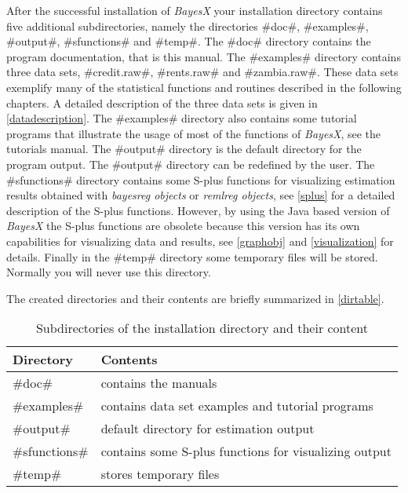 After the successful installation of {\em BayesX} your installation
directory contains five additional subdirectories, namely the
directories #doc#, #examples#, #output#, #sfunctions# and #temp#.
The #doc# directory contains the program documentation, that is this
manual. The #examples# directory contains three data sets,
#credit.raw#, #rents.raw# and #zambia.raw#. These data sets
exemplify many of the statistical functions and routines described
in the following chapters. A detailed description of the three data
sets is given in \autoref{datadescription}. The #examples# directory
also contains some tutorial programs that illustrate the usage of
most of the functions of {\em BayesX}, see the tutorials manual. The
#output# directory is the default directory for the program output.
The #output# directory can be redefined by the user. The
#sfunctions# directory contains some S-plus functions for
visualizing estimation results obtained with {\em bayesreg objects}
or {\em remlreg objects}, see \autoref{splus} for a detailed
description of the S-plus functions. However, by using the Java
based version of {\em BayesX} the S-plus functions are obsolete
because this version has its own capabilities for visualizing data
and results, see \autoref{graphobj} and \autoref{visualization} for
details. Finally in the #temp# directory some temporary files will
be stored. Normally you will never use this directory.

The created directories and their contents are briefly summarized
in \autoref{dirtable}.

\begin{table}[ht]
\begin{center}
\begin{tabular}{|l|l|}
\hline
Directory & Contents \\
\hline
#doc# & contains the manuals \\
#examples# & contains data set examples and tutorial programs \\
#output# & default directory for estimation output \\
#sfunctions# & contains some S-plus functions for visualizing output \\
#temp# & stores temporary files \\
\hline
\end{tabular}
{\em\caption{ \label{dirtable} Subdirectories of the installation
directory and their content}}
\end{center}
\end{table}

